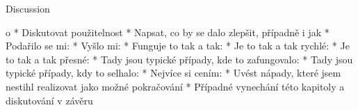 \chap Discussion

		\Green
		\begitems \style o
			* Diskutovat použitelnost
			* Napsat, co by se dalo zlepšit, případně i jak
			* Podařilo se mi:
			* Vyšlo mi:
			* Funguje to tak a tak:
			* Je to tak a tak rychlé:
			* Je to tak a tak přesné:
			* Tady jsou typické případy, kde to zafungovalo:
			* Tady jsou typické případy, kdy to selhalo:
			* Nejvíce si cením:
			* Uvést nápady, které jsem nestihl realizovat jako možné pokračování
			* Případné vynechání této kapitoly a diskutování v závěru
		\enditems
		\Black

